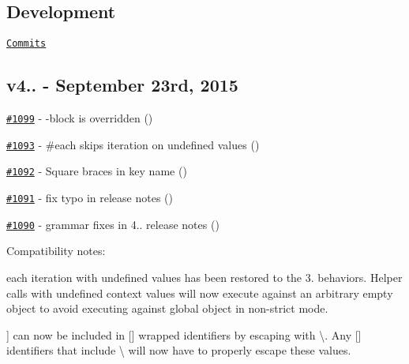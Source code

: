 \subsection*{Development}

\href{https://github.com/wycats/handlebars.js/compare/v4.0.3...master}{\tt Commits}

\subsection*{v4.. -\/ September 23rd, 2015}


\begin{DoxyItemize}
\item \href{https://github.com/wycats/handlebars.js/issues/1099}{\tt \#1099} -\/ -\/block is overridden (\href{https://api.github.com/users/btmorex}{\tt })
\item \href{https://github.com/wycats/handlebars.js/issues/1093}{\tt \#1093} -\/ \#each skips iteration on undefined values (\href{https://api.github.com/users/florianpilz}{\tt })
\item \href{https://github.com/wycats/handlebars.js/issues/1092}{\tt \#1092} -\/ Square braces in key name (\href{https://api.github.com/users/distantnative}{\tt })
\item \href{https://github.com/wycats/handlebars.js/pull/1091}{\tt \#1091} -\/ fix typo in release notes (\href{https://api.github.com/users/nikolas}{\tt })
\item \href{https://github.com/wycats/handlebars.js/pull/1090}{\tt \#1090} -\/ grammar fixes in 4.. release notes (\href{https://api.github.com/users/nikolas}{\tt })
\end{DoxyItemize}

Compatibility notes\+:
\begin{DoxyItemize}
\item {\ttfamily each} iteration with {\ttfamily undefined} values has been restored to the 3. behaviors. Helper calls with undefined context values will now execute against an arbitrary empty object to avoid executing against global object in non-\/strict mode.
\item {\ttfamily \mbox{]}} can now be included in {\ttfamily \mbox{[}\mbox{]}} wrapped identifiers by escaping with {\ttfamily \textbackslash{}}. Any {\ttfamily \mbox{[}\mbox{]}} identifiers that include {\ttfamily \textbackslash{}} will now have to properly escape these values.
\end{DoxyItemize}

